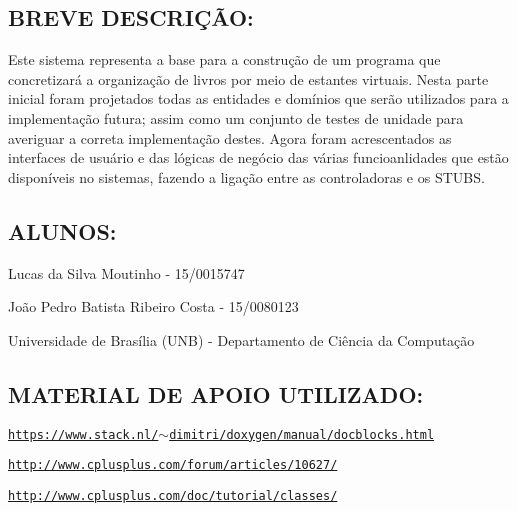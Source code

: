 \subsection*{B\+R\+E\+VE D\+E\+S\+C\+R\+IÇÃO\+:}

Este sistema representa a base para a construção de um programa que concretizará a organização de livros por meio de estantes virtuais. Nesta parte inicial foram projetados todas as entidades e domínios que serão utilizados para a implementação futura; assim como um conjunto de testes de unidade para averiguar a correta implementação destes. Agora foram acrescentados as interfaces de usuário e das lógicas de negócio das várias funcioanlidades que estão disponíveis no sistemas, fazendo a ligação entre as controladoras e os S\+T\+U\+BS.

\subsection*{A\+L\+U\+N\+OS\+:}


\begin{DoxyItemize}
\item Lucas da Silva Moutinho -\/ 15/0015747
\item João Pedro Batista Ribeiro Costa -\/ 15/0080123
\item Universidade de Brasília (U\+NB) -\/ Departamento de Ciência da Computação
\end{DoxyItemize}

\subsection*{M\+A\+T\+E\+R\+I\+AL DE A\+P\+O\+IO U\+T\+I\+L\+I\+Z\+A\+DO\+:}


\begin{DoxyItemize}
\item \href{https://www.stack.nl/~dimitri/doxygen/manual/docblocks.html}{\tt https\+://www.\+stack.\+nl/$\sim$dimitri/doxygen/manual/docblocks.\+html}
\item \href{http://www.cplusplus.com/forum/articles/10627/}{\tt http\+://www.\+cplusplus.\+com/forum/articles/10627/}
\item \href{http://www.cplusplus.com/doc/tutorial/classes/}{\tt http\+://www.\+cplusplus.\+com/doc/tutorial/classes/} 
\end{DoxyItemize}